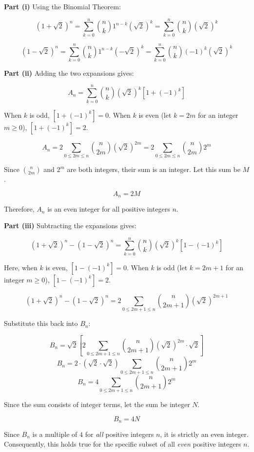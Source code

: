 \begin{solution}[Brief]
\textbf{Part (i)}
Using the Binomial Theorem:

$$(1+\sqrt{2})^n = \sum_{k=0}^n \binom{n}{k} 1^{n-k} (\sqrt{2})^k = \sum_{k=0}^n \binom{n}{k} (\sqrt{2})^k$$

$$(1-\sqrt{2})^n = \sum_{k=0}^n \binom{n}{k} 1^{n-k} (-\sqrt{2})^k = \sum_{k=0}^n \binom{n}{k} (-1)^k (\sqrt{2})^k$$

\textbf{Part (ii)}
Adding the two expansions gives:

$$A_n = \sum_{k=0}^n \binom{n}{k} (\sqrt{2})^k [1 + (-1)^k]$$

When $k$ is odd, $[1 + (-1)^k] = 0$. When $k$ is even (let $k = 2m$ for an integer $m \ge 0$), $[1 + (-1)^k] = 2$.

$$A_n = 2 \sum_{0 \le 2m \le n} \binom{n}{2m} (\sqrt{2})^{2m} = 2 \sum_{0 \le 2m \le n} \binom{n}{2m} 2^m$$

Since $\binom{n}{2m}$ and $2^m$ are both integers, their sum is an integer. Let this sum be $M$.

$$A_n = 2M$$

Therefore, $A_n$ is an even integer for all positive integers $n$.

\textbf{Part (iii)}
Subtracting the expansions gives:

$$(1+\sqrt{2})^n - (1-\sqrt{2})^n = \sum_{k=0}^n \binom{n}{k} (\sqrt{2})^k [1 - (-1)^k]$$

Here, when $k$ is even, $[1 - (-1)^k] = 0$. When $k$ is odd (let $k = 2m+1$ for an integer $m \ge 0$), $[1 - (-1)^k] = 2$.

$$(1+\sqrt{2})^n - (1-\sqrt{2})^n = 2 \sum_{0 \le 2m+1 \le n} \binom{n}{2m+1} (\sqrt{2})^{2m+1}$$

Substitute this back into $B_n$:

$$B_n = \sqrt{2} \left[ 2 \sum_{0 \le 2m+1 \le n} \binom{n}{2m+1} (\sqrt{2})^{2m} \cdot \sqrt{2} \right]$$
$$B_n = 2 \cdot (\sqrt{2} \cdot \sqrt{2}) \sum_{0 \le 2m+1 \le n} \binom{n}{2m+1} 2^m$$
$$B_n = 4 \sum_{0 \le 2m+1 \le n} \binom{n}{2m+1} 2^m$$

Since the sum consists of integer terms, let the sum be integer $N$.

$$B_n = 4N$$

Since $B_n$ is a multiple of $4$ for \textit{all} positive integers $n$, it is strictly an even integer. Consequently, this holds true for the specific subset of all \textit{even} positive integers $n$.
\end{solution}

